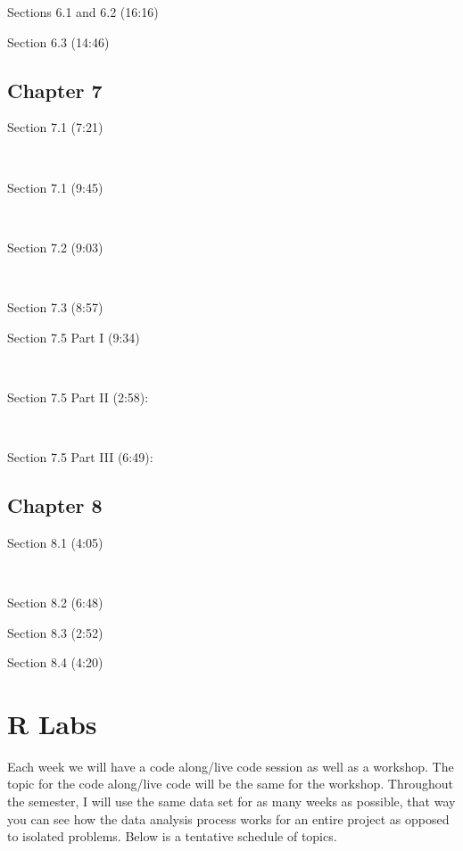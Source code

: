 \documentclass[
]{book}
\begin{document}
Sections 6.1 and 6.2 (16:16)

Section 6.3 (14:46)

\hypertarget{chapter-7}{%
\section{Chapter 7}\label{chapter-7}}

Section 7.1 (7:21)

~

Section 7.1 (9:45)

~

Section 7.2 (9:03)

~

Section 7.3 (8:57)

Section 7.5 Part I (9:34)

~

Section 7.5 Part II (2:58):

~

Section 7.5 Part III (6:49):

\hypertarget{chapter-8}{%
\section{Chapter 8}\label{chapter-8}}

Section 8.1 (4:05)

~

Section 8.2 (6:48)

Section 8.3 (2:52)

Section 8.4 (4:20)

\hypertarget{r-labs}{%
\chapter{R Labs}\label{r-labs}}

Each week we will have a code along/live code session as well as a workshop. The topic for the code along/live code will be the same for the workshop. Throughout the semester, I will use the same data set for as many weeks as possible, that way you can see how the data analysis process works for an entire project as opposed to isolated problems. Below is a tentative schedule of topics.
\end{document}
